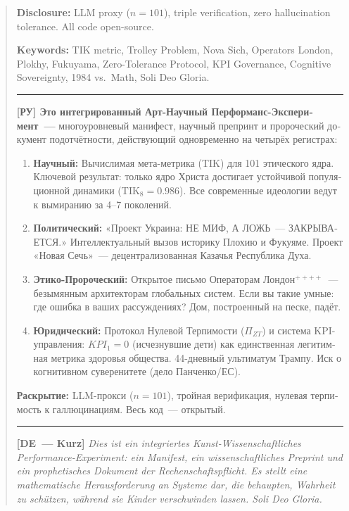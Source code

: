 \documentclass[11pt,a4paper]{article}
\theoremstyle{definition}
\theoremstyle{remark}
\newcommand{\TIKeight}{\text{TIK}_8}
\newcommand{\ZTP}{\Pi_{ZT}}                  %
\begin{document}
\begin{abstract}
\noindent\textbf{Disclosure:} LLM proxy ($n=101$), triple verification,
zero hallucination tolerance. All code open-source.
\medskip

\noindent\textbf{Keywords:} TIK metric, Trolley Problem, Nova Sich,
Operators London, Plokhy, Fukuyama, Zero-Tolerance Protocol, KPI Governance,
Cognitive Sovereignty, 1984 vs.\ Math, Soli Deo Gloria.

\vspace{0.6cm}
\hrule
\vspace{0.4cm}

\noindent\textbf{\foreignlanguage{russian}{[РУ]
Это интегрированный Арт-Научный Перформанс-Эксперимент~---}}
\foreignlanguage{russian}{многоуровневый манифест, научный препринт
и пророческий документ подотчётности, действующий одновременно
на четырёх регистрах:}

\begin{enumerate}[noitemsep, leftmargin=1.5cm]
  \item \foreignlanguage{russian}{\textbf{Научный:} Вычислимая
    мета-метрика (TIK) для 101 этического ядра. Ключевой результат:
    только ядро Христа достигает устойчивой популяционной динамики
    ($\TIKeight = 0.986$). Все современные идеологии ведут к вымиранию
    за 4--7 поколений.}
  \item \foreignlanguage{russian}{\textbf{Политический:}
    «Проект Украина: НЕ МИФ, А ЛОЖЬ~--- ЗАКРЫВАЕТСЯ.»
    Интеллектуальный вызов историку Плохию и Фукуяме.
    Проект «Новая Сечь»~--- децентрализованная Казачья Республика Духа.}
  \item \foreignlanguage{russian}{\textbf{Этико-Пророческий:}
    Открытое письмо Операторам Лондон$^{++++}$~--- безымянным
    архитекторам глобальных систем. Если вы такие умные: где ошибка
    в ваших рассуждениях? Дом, построенный на песке, падёт.}
  \item \foreignlanguage{russian}{\textbf{Юридический:}
    Протокол Нулевой Терпимости ($\ZTP$) и система KPI-управления:
    $KPI_1 = 0$ (исчезнувшие дети) как единственная легитимная метрика
    здоровья общества. 44-дневный ультиматум Трампу.
    Иск о когнитивном суверенитете (дело Панченко/ЕС).}
\end{enumerate}

\foreignlanguage{russian}{
\noindent\textbf{Раскрытие:} LLM-прокси ($n=101$),
тройная верификация, нулевая терпимость к галлюцинациям.
Весь код~--- открытый.}

\vspace{0.4cm}
\hrule
\vspace{0.4cm}

\noindent\textbf{[DE~--- Kurz]}
\textit{Dies ist ein integriertes Kunst-Wissenschaftliches
  Performance-Experiment: ein Manifest, ein wissenschaftliches Preprint
  und ein prophetisches Dokument der Rechenschaftspflicht.
  Es stellt eine mathematische Herausforderung an Systeme dar,
  die behaupten, Wahrheit zu schützen, während sie Kinder verschwinden lassen.
  Soli Deo Gloria.}

\end{abstract}
\end{document}
